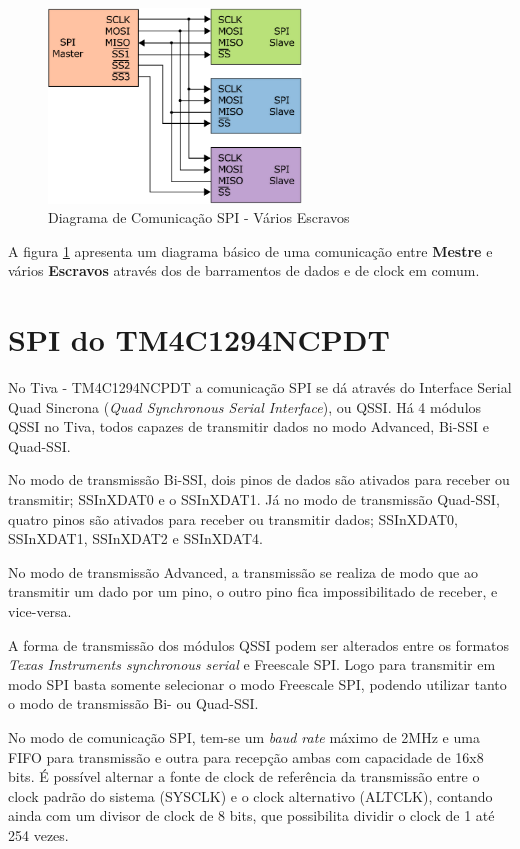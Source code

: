 \begin{figure}[H]
	\centering
	\includegraphics[width=0.6\textwidth] {figuras/BarramentoSPI.eps}
	\caption{Diagrama de Comunicação SPI - Vários Escravos}
	\label{fig:SPIDiagrama}
\end{figure}

A figura  \ref{fig:SPIDiagrama} apresenta um diagrama básico de uma comunicação entre \textbf{Mestre} e vários \textbf{Escravos} através dos de barramentos de dados e de clock em comum.  

\section{SPI do TM4C1294NCPDT}

No Tiva - TM4C1294NCPDT a comunicação SPI se dá através do Interface Serial Quad Sincrona (\emph{Quad Synchronous Serial Interface}), ou QSSI. Há 4 módulos QSSI no Tiva, todos capazes de transmitir dados no modo Advanced, Bi-SSI e Quad-SSI.

No modo de transmissão Bi-SSI, dois pinos de dados são ativados para receber ou transmitir; SSInXDAT0 e o SSInXDAT1. Já no modo de transmissão Quad-SSI, quatro pinos são ativados para receber ou transmitir dados; SSInXDAT0, SSInXDAT1, SSInXDAT2 e SSInXDAT4. 

No modo de transmissão Advanced, a transmissão se realiza de modo que ao transmitir um dado por um pino, o outro pino fica impossibilitado de receber, e vice-versa.

A forma de transmissão dos módulos QSSI podem ser alterados entre os formatos \emph{Texas Instruments synchronous serial} e Freescale SPI. Logo para transmitir em modo SPI basta somente selecionar o modo Freescale SPI, podendo utilizar tanto o modo de transmissão Bi- ou  Quad-SSI.

No modo de comunicação SPI, tem-se um \emph{baud rate} máximo de 2MHz e uma FIFO para transmissão e outra para recepção ambas com capacidade de 16x8 bits. É possível alternar a fonte de clock de referência da transmissão entre o clock padrão do sistema (SYSCLK) e o clock alternativo (ALTCLK), contando ainda com um divisor de clock de 8 bits, que possibilita dividir o clock de 1 até 254 vezes.  

